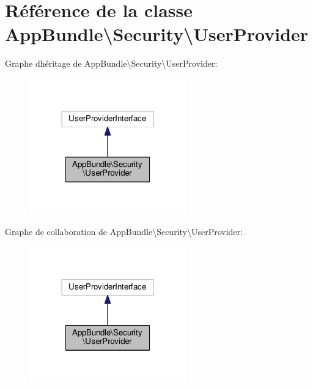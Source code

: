 \hypertarget{classAppBundle_1_1Security_1_1UserProvider}{}\section{Référence de la classe App\+Bundle\textbackslash{}Security\textbackslash{}User\+Provider}
\label{classAppBundle_1_1Security_1_1UserProvider}


Graphe d\textquotesingle{}héritage de App\+Bundle\textbackslash{}Security\textbackslash{}User\+Provider\+:\nopagebreak
\begin{figure}[H]
\begin{center}
\leavevmode
\includegraphics[width=192pt]{classAppBundle_1_1Security_1_1UserProvider__inherit__graph}
\end{center}
\end{figure}


Graphe de collaboration de App\+Bundle\textbackslash{}Security\textbackslash{}User\+Provider\+:\nopagebreak
\begin{figure}[H]
\begin{center}
\leavevmode
\includegraphics[width=192pt]{classAppBundle_1_1Security_1_1UserProvider__coll__graph}
\end{center}
\end{figure}
